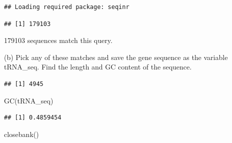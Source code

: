 \documentclass[
]{article}
\newenvironment{Shaded}{\begin{snugshade}}{\end{snugshade}}
\newcommand{\DecValTok}[1]{\textcolor[rgb]{0.00,0.00,0.81}{#1}}
\newcommand{\FunctionTok}[1]{\textcolor[rgb]{0.00,0.00,0.00}{#1}}
\newcommand{\NormalTok}[1]{#1}
\newcommand{\OtherTok}[1]{\textcolor[rgb]{0.56,0.35,0.01}{#1}}
\newcommand{\SpecialCharTok}[1]{\textcolor[rgb]{0.00,0.00,0.00}{#1}}
\newcommand{\StringTok}[1]{\textcolor[rgb]{0.31,0.60,0.02}{#1}}
\begin{document}
\begin{verbatim}
## Loading required package: seqinr
\end{verbatim}

\begin{Shaded}
\end{Shaded}

\begin{verbatim}
## [1] 179103
\end{verbatim}

{ 179103 sequences match this query. }

(b) Pick any of these matches and save the gene sequence as the variable
tRNA\_seq. Find the length and GC content of the sequence. \span

\begin{Shaded}
\end{Shaded}

\begin{verbatim}
## [1] 4945
\end{verbatim}

\begin{Shaded}
\begin{Highlighting}[]
\FunctionTok{GC}\NormalTok{(tRNA\_seq)}
\end{Highlighting}
\end{Shaded}

\begin{verbatim}
## [1] 0.4859454
\end{verbatim}

\begin{Shaded}
\begin{Highlighting}[]
\FunctionTok{closebank}\NormalTok{()}
\end{Highlighting}
\end{Shaded}
\end{document}
